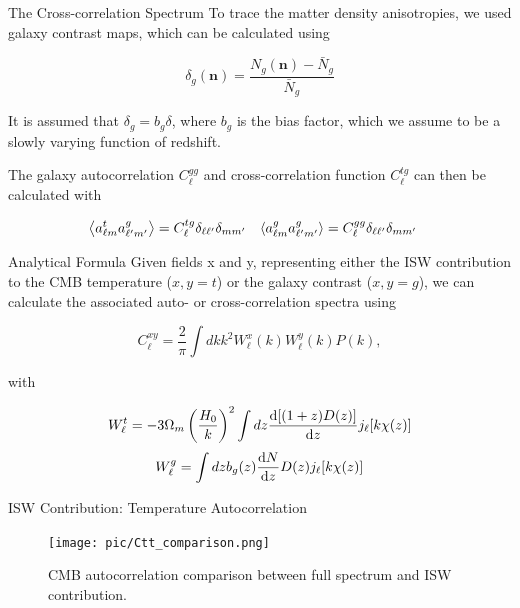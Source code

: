 \documentclass[serif, aspectratio=169]{beamer}
\begin{document}
\begin{frame}{The Cross-correlation Spectrum}
    To trace the matter density anisotropies, we used galaxy contrast maps, which can be calculated using

    \begin{equation}
        \delta_g(\mathbf{n})=\frac{N_g(\mathbf{n})-\bar{N}_g}{\bar{N}_g}
    \end{equation}

    It is assumed that $\delta_g=b_g\delta$, where $b_g$ is the bias factor, which we assume to be a slowly varying function of redshift. 

    The galaxy autocorrelation $C_{\ell}^{gg}$ and cross-correlation function $C_\ell^{tg}$ can then be calculated with

    \begin{align}
        \left\langle a_{\ell m}^t a_{\ell'm'}^g \right\rangle&=C_\ell^{tg}\delta_{\ell \ell'}\delta_{mm'} & \left\langle a_{\ell m}^g a_{\ell'm'}^g \right\rangle&=C_\ell^{gg}\delta_{\ell \ell'}\delta_{mm'}
    \end{align}
\end{frame}

\begin{frame}{Analytical Formula}
    Given fields x and y, representing either the ISW contribution to the CMB temperature ($x,y=t$) or the galaxy contrast ($x,y=g$), we can calculate the associated auto- or cross-correlation spectra using \cite{Moura-Santos_2016}

    \begin{equation}
        C_\ell^{xy}=\frac{2}{\pi}\int dk k^2 W_\ell^x(k)W_\ell^y(k)P(k),
    \end{equation}

    with

    \begin{equation}
        W_\ell^t=-3\Omega_m\left(\frac{H_0}{k}\right)^2\int dz \dv{[(1+z)D(z)]}{z}j_\ell[k\chi(z)]
    \end{equation}
    \begin{equation}\label{Wg}
        W_\ell^g=\int dz b_g(z)\dv{N}{z}D(z)j_\ell[k\chi(z)]
    \end{equation}
\end{frame}

\begin{frame}{ISW Contribution: Temperature Autocorrelation}
    \begin{figure}
        \centering
        \texttt{[image: pic/Ctt\_comparison.png]}
        \caption{CMB autocorrelation comparison between full spectrum and ISW contribution.}
        \label{fig:ISWplots_Ctt}
    \end{figure}
\end{frame}
\end{document}
